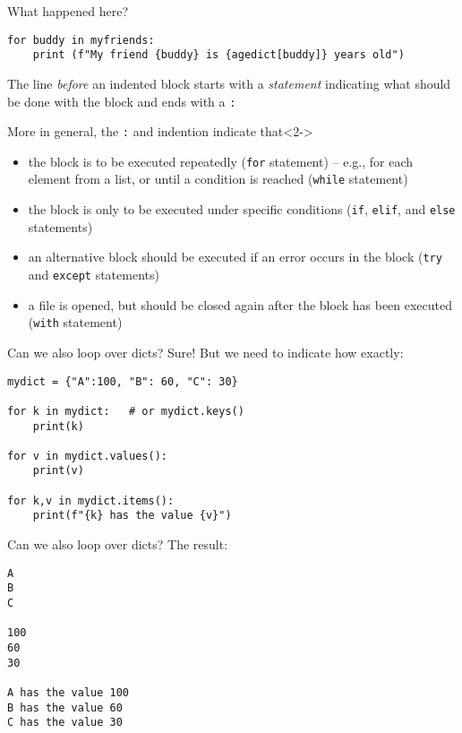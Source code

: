\begin{frame}[fragile]{What happened here?}
\begin{verbatim}
for buddy in myfriends:
    print (f"My friend {buddy} is {agedict[buddy]} years old")
\end{verbatim}
\small
The line \emph{before} an indented block starts with a \emph{statement} indicating what should be done with the block and ends with a \texttt{:}

\footnotesize
\begin{block}{More in general, the \texttt{:} and indention indicate that}<2->
	\begin{itemize}
		\item<3-> the block is to be executed repeatedly (\texttt{for} statement) – e.g., for each element from a list, or until a condition is reached (\texttt{while} statement)
		\item<4-> the block is only to be executed under specific conditions (\texttt{if}, \texttt{elif}, and \texttt{else} statements)
		\item<5-> an alternative block should be executed if an error occurs in the block (\texttt{try} and \texttt{except} statements)
		\item<6-> a file is opened, but should be closed again after the block has been executed (\texttt{with} statement)
	\end{itemize}
\end{block}
\end{frame}



\begin{frame}[fragile]{Can we also loop over dicts?}
Sure! But we need to indicate how exactly:

\begin{verbatim}
mydict = {"A":100, "B": 60, "C": 30}

for k in mydict:   # or mydict.keys()
    print(k)

for v in mydict.values():
    print(v)

for k,v in mydict.items():
    print(f"{k} has the value {v}")
\end{verbatim}

\end{frame}




\begin{frame}[fragile]{Can we also loop over dicts?}
The result:

\begin{verbatim}
A
B
C

100
60
30

A has the value 100
B has the value 60
C has the value 30
\end{verbatim}

\end{frame}




